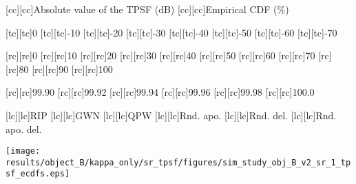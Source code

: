 [cc][cc]{\footnotesize Absolute value of the \acs{TPSF} (\si{\deci\bel})}
[cc][cc]{\footnotesize Empirical \acs{CDF} (\si{\percent})}

[tc][tc]{\scriptsize 0}
[tc][tc]{\scriptsize -10}
[tc][tc]{\scriptsize -20}
[tc][tc]{\scriptsize -30}
[tc][tc]{\scriptsize -40}
[tc][tc]{\scriptsize -50}
[tc][tc]{\scriptsize -60}
[tc][tc]{\scriptsize -70}

[rc][rc]{\scriptsize 0}
[rc][rc]{\scriptsize 10}
[rc][rc]{\scriptsize 20}
[rc][rc]{\scriptsize 30}
[rc][rc]{\scriptsize 40}
[rc][rc]{\scriptsize 50}
[rc][rc]{\scriptsize 60}
[rc][rc]{\scriptsize 70}
[rc][rc]{\scriptsize 80}
[rc][rc]{\scriptsize 90}
[rc][rc]{\scriptsize 100}

[rc][rc]{\tiny 99.90}
[rc][rc]{\tiny 99.92}
[rc][rc]{\tiny 99.94}
[rc][rc]{\tiny 99.96}
[rc][rc]{\tiny 99.98}
[rc][rc]{\tiny 100.0}

[lc][lc]{\footnotesize \acs{RIP}}
[lc][lc]{\footnotesize \acs{GWN}}
[lc][lc]{\footnotesize \acs{QPW}}
[lc][lc]{\footnotesize Rnd. apo.}
[lc][lc]{\footnotesize Rnd. del.}
[lc][lc]{\footnotesize Rnd. apo. del.}

\texttt{[image: results/object\_B/kappa\_only/sr\_tpsf/figures/sim\_study\_obj\_B\_v2\_sr\_1\_tpsf\_ecdfs.eps]}
